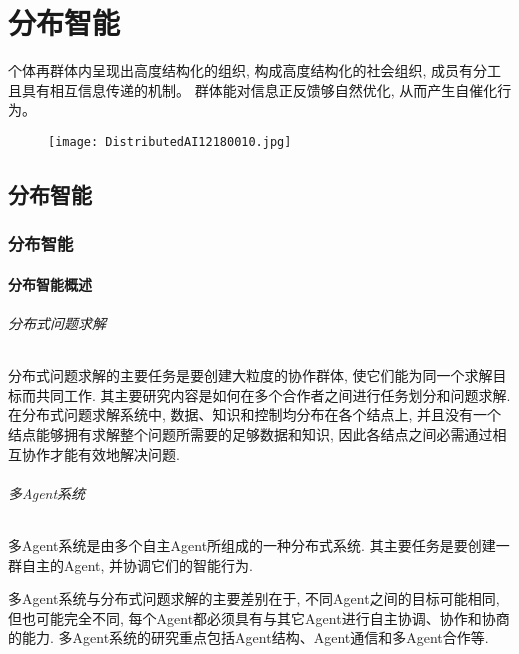 
\chapter{分布智能}\label{SSPChapter9}
\begin{tcolorbox}[colback=white!50,colframe=orange!50,title=分布智能]
\begin{center}
个体再群体内呈现出高度结构化的组织, 构成高度结构化的社会组织, 成员有分工且具有相互信息传递的机制。
群体能对信息正反馈够自然优化, 从而产生自催化行为。
\hfill
\end{center}
\end{tcolorbox}
\begin{figure}[H]
\centering
\texttt{[image: DistributedAI12180010.jpg]}
\caption{}
\label{DistributedAI12180010}
\end{figure}
\section{分布智能}
\subsection{分布智能}
\subsubsection{分布智能概述}
\subparagraph{分布式问题求解}

分布式问题求解的主要任务是要创建大粒度的协作群体, 使它们能为同一个求解目标而共同工作. 其主要研究内容是如何在多个合作者之间进行任务划分和问题求解. 在分布式问题求解系统中, 数据、知识和控制均分布在各个结点上, 并且没有一个结点能够拥有求解整个问题所需要的足够数据和知识, 因此各结点之间必需通过相互协作才能有效地解决问题.
\subparagraph{多Agent系统}
多Agent系统是由多个自主Agent所组成的一种分布式系统. 其主要任务是要创建一群自主的Agent, 并协调它们的智能行为.

多Agent系统与分布式问题求解的主要差别在于, 不同Agent之间的目标可能相同, 但也可能完全不同, 每个Agent都必须具有与其它Agent进行自主协调、协作和协商的能力. 多Agent系统的研究重点包括Agent结构、Agent通信和多Agent合作等.
